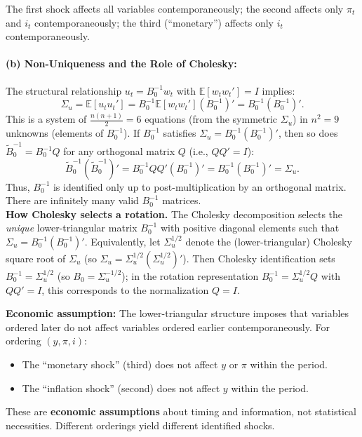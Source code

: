 \documentclass[12pt]{article}
\newcommand{\E}{\mathbb E}
\theoremstyle{definition}
\begin{document}
\noindent The first shock affects all variables contemporaneously; the second affects only $\pi_t$ and $i_t$ contemporaneously; the third (``monetary'') affects only $i_t$ contemporaneously.

\bigskip
\paragraph{(b) Non-Uniqueness and the Role of Cholesky:}
 
The structural relationship $u_t = B_0^{-1} w_t$ with $\E[w_t w_t'] = I$ implies:
\[
\Sigma_u = \E[u_t u_t'] = B_0^{-1} \E[w_t w_t'] (B_0^{-1})' = B_0^{-1} (B_0^{-1})'.
\]
This is a system of $\frac{n(n+1)}{2} = 6$ equations (from the symmetric $\Sigma_u$) in $n^2 = 9$ unknowns (elements of $B_0^{-1}$). If $B_0^{-1}$ satisfies $\Sigma_u = B_0^{-1} (B_0^{-1})'$, then so does $\tilde{B}_0^{-1} = B_0^{-1} Q$ for any orthogonal matrix $Q$ (i.e., $Q Q' = I$):
\[
\tilde{B}_0^{-1} (\tilde{B}_0^{-1})' = B_0^{-1} Q Q' (B_0^{-1})' = B_0^{-1} (B_0^{-1})' = \Sigma_u.
\]
Thus, $B_0^{-1}$ is identified only up to post-multiplication by an orthogonal matrix. There are infinitely many valid $B_0^{-1}$ matrices. \\



\noindent \textbf{How Cholesky selects a rotation.} The Cholesky decomposition selects the \emph{unique} lower-triangular matrix $B_0^{-1}$ with positive diagonal elements such that $\Sigma_u = B_0^{-1} (B_0^{-1})'$. Equivalently, let $\Sigma_u^{1/2}$ denote the (lower-triangular) Cholesky square root of $\Sigma_u$ (so $\Sigma_u=\Sigma_u^{1/2}(\Sigma_u^{1/2})'$). Then Cholesky identification sets $B_0^{-1}=\Sigma_u^{1/2}$ (so $B_0=\Sigma_u^{-1/2}$); in the rotation representation $B_0^{-1}=\Sigma_u^{1/2}Q$ with $QQ'=I$, this corresponds to the normalization $Q=I$.


\noindent \textbf{Economic assumption:} The lower-triangular structure imposes that variables ordered later do not affect variables ordered earlier contemporaneously. For ordering $(y, \pi, i)$:
\begin{itemize}
    \item The ``monetary shock'' (third) does not affect $y$ or $\pi$ within the period.
    \item The ``inflation shock'' (second) does not affect $y$ within the period.
\end{itemize}
These are \textbf{economic assumptions} about timing and information, not statistical necessities. Different orderings yield different identified shocks.
\end{document}
